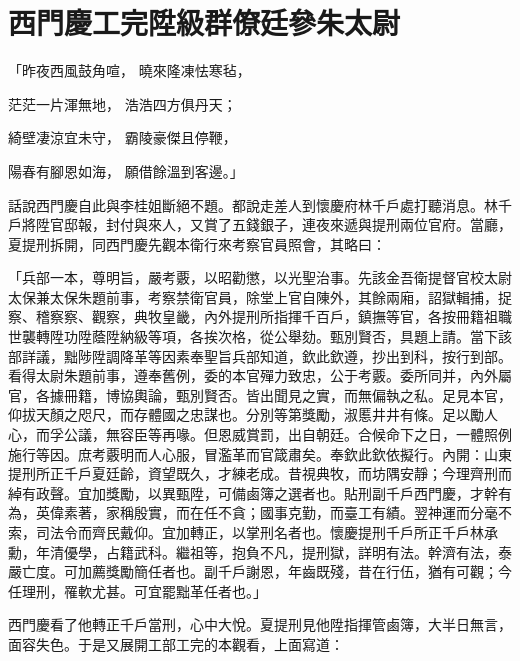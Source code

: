 %

\chapter{西門慶工完陞級\KG 群僚廷參朱太尉}


\begin{showcontents}{}



「昨夜西風鼓角喧，  曉來隆凍怯寒毡，

茫茫一片渾無地，  浩浩四方俱丹天；

綺壁凄涼宜未守，  霸陵豪傑且停鞭，

陽春有腳恩如海，  願借餘溫到客邊。」

話說西門慶自此與李桂姐斷絕不題。都說走差人到懷慶府林千戶處打聽消息。林千戶將陞官邸報，封付與來人，又賞了五錢銀子，連夜來遞與提刑兩位官府。當廳，夏提刑拆開，同西門慶先觀本衛行來考察官員照會，其略曰：

「兵部一本，尊明旨，嚴考覈，以昭勸懲，以光聖治事。先該金吾衛提督官校太尉太保兼太保朱題前事，考察禁衛官員，除堂上官自陳外，其餘兩廂，詔獄輯捕，捉察、稽察察、觀察，典牧皇畿，內外提刑所指揮千百戶，鎮撫等官，各按冊籍祖職世襲轉陞功陞蔭陞納級等項，各挨次格，從公舉劾。甄別賢否，具題上請。當下該部詳議，黜陟陞調降革等因素奉聖旨兵部知道，欽此欽遵，抄出到科，按行到部。看得太尉朱題前事，遵奉舊例，委的本官殫力致忠，公于考覈。委所同并，內外屬官，各據冊籍，博協輿論，甄別賢否。皆出聞見之實，而無偏執之私。足見本官，仰拔天顏之咫尺，而存體國之忠謀也。分別等第獎勵，淑慝井井有條。足以勵人心，而孚公議，無容臣等再喙。但恩威賞罰，出自朝廷。合候命下之日，一體照例施行等因。庶考覈明而人心服，冒濫革而官箴肅矣。奉欽此欽依擬行。內開：山東提刑所正千戶夏廷齡，資望既久，才練老成。昔視典牧，而坊隅安靜；今理齊刑而綽有政聲。宜加獎勵，以異甄陞，可備鹵簿之選者也。貼刑副千戶西門慶，才幹有為，英偉素著，家稱殷實，而在任不貪；國事克勤，而臺工有績。翌神運而分毫不索，司法令而齊民戴仰。宜加轉正，以掌刑名者也。懷慶提刑千戶所正千戶林承勳，年清優學，占籍武科。繼祖等，抱負不凡，提刑獄，詳明有法。幹濟有法，泰嚴亡度。可加薦獎勵簡任者也。副千戶謝恩，年齒既殘，昔在行伍，猶有可觀；今任理刑，罹軟尤甚。可宜罷黜革任者也。」

西門慶看了他轉正千戶當刑，心中大悅。夏提刑見他陞指揮管鹵簿，大半日無言，面容失色。于是又展開工部工完的本觀看，上面寫道：


\end{showcontents}
